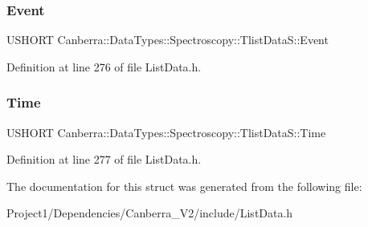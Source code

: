 \subsubsection{\texorpdfstring{Event}{Event}}
{\footnotesize\ttfamily U\+S\+H\+O\+RT Canberra\+::\+Data\+Types\+::\+Spectroscopy\+::\+Tlist\+Data\+S\+::\+Event}



Definition at line 276 of file List\+Data.\+h.

\mbox{\label{struct_canberra_1_1_data_types_1_1_spectroscopy_1_1_tlist_data_s_a7764eef5af1c35cf7c91a38604a91e2c}} 
\subsubsection{\texorpdfstring{Time}{Time}}
{\footnotesize\ttfamily U\+S\+H\+O\+RT Canberra\+::\+Data\+Types\+::\+Spectroscopy\+::\+Tlist\+Data\+S\+::\+Time}



Definition at line 277 of file List\+Data.\+h.



The documentation for this struct was generated from the following file\+:\begin{DoxyCompactItemize}
\item 
Project1/\+Dependencies/\+Canberra\+\_\+\+V2/include/List\+Data.\+h\end{DoxyCompactItemize}
